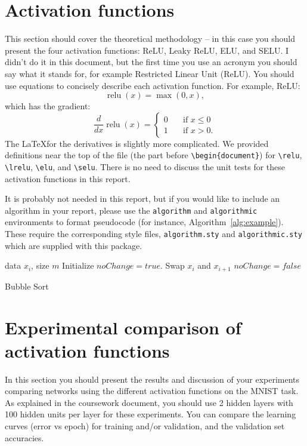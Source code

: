 \documentclass{article}
\DeclareMathOperator{\relu}{relu}
\DeclareMathOperator{\lrelu}{lrelu}
\DeclareMathOperator{\elu}{elu}
\DeclareMathOperator{\selu}{selu}
\begin{document}
\section{Activation functions}
\label{sec:actfn}
This section should cover the theoretical methodology -- in this case you should present the four activation functions: ReLU, Leaky ReLU, ELU, and SELU.  I didn't do it in this document, but the first time you use an acronym you should say what it stands for, for example Restricted Linear Unit (ReLU).  You should use equations to concisely describe each activation function.  For example, ReLU: 
\begin{equation}
  \relu(x) = \max(0, x) ,
\end{equation} 
which has the gradient:
\begin{equation}
  \frac{d}{dx} \relu(x) =
     \begin{cases} 
      0      & \quad \text{if } x \leq  0 \\
      1       & \quad \text{if } x > 0 .
    \end{cases} 
\end{equation}
The \LaTeX for the derivatives is slightly more complicated.  We provided definitions near the top of the file (the part before \verb+\begin{document}+) for \verb+\relu+, \verb+\lrelu+, \verb+\elu+, and \verb+\selu+.  There is no need to discuss the unit tests for these activation functions in this report.

It is probably not needed in this report, but if you would like to include an algorithm in your report, please use the \verb+algorithm+ and \verb+algorithmic+ environments to format pseudocode (for instance, Algorithm~\ref{alg:example}). These require the corresponding style files, \verb+algorithm.sty+ and \verb+algorithmic.sty+ which are supplied with this package. 

\begin{algorithm}[ht]
\begin{algorithmic}
    data $x_i$, size $m$
   \REPEAT
   \STATE Initialize $noChange = true$.
   \STATE Swap $x_i$ and $x_{i+1}$
   \STATE $noChange = false$
   \ENDIF
   \ENDFOR
\end{algorithmic}
  \caption{Bubble Sort}
  \label{alg:example}
\end{algorithm}

\section{Experimental comparison of activation functions}
\label{sec:actexpts}
In this section you should present the results and discussion of your experiments comparing networks using the different activation functions on the MNIST task.  As explained in the coursework document, you should use 2 hidden layers with 100 hidden units per layer for these experiments.  You can compare the learning curves (error vs epoch) for training and/or validation, and the validation set accuracies. 
\end{document}
